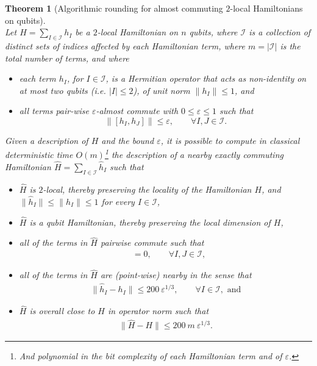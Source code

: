 \documentclass[a4paper,onecolumn,11pt]{quantumarticle}
\theoremstyle{plain}
\newtheorem{theorem}{Theorem}[section]
\newcommand{\eps}{\varepsilon}
\begin{document}
\begin{theorem}[Algorithmic rounding for almost commuting $2$-local Hamiltonians on qubits]\label{thm:transforming-hamiltonian}\ \\
Let $H = \sum\limits_{I \in \mathcal{I}} h_{I}$ be a $2$-local 
Hamiltonian on $n$ qubits, where $\mathcal{I}$ is a collection of distinct sets of indices affected by each Hamiltonian term, where $m = |\mathcal{I}|$ is the total number of terms, and where
\begin{itemize}
    \item each term $h_{I}$, for $I \in \mathcal{I}$, is a Hermitian operator that acts as non-identity on at most two qubits (i.e. $|I| \leq 2$), of unit norm $\| h_I \| \leq 1$, and
    \item all terms pair-wise $\eps$-almost commute with $0 \leq \eps \leq 1$ such that
\[ \| [h_{I}, h_{J} ] \| \leq \eps, \quad\quad \forall I, J \in \mathcal{I}. \]
\end{itemize}
Given a description of $H$ and the bound $\eps$, it is possible to compute in classical deterministic time $O(m)$\footnote{And polynomial in the bit complexity of each Hamiltonian term and of $\eps$.} the description of a nearby exactly commuting Hamiltonian $\hat{H} = \sum\limits_{I \in \mathcal{I}} \hat{h}_{I}$ such that 
\begin{itemize}
\item $\hat{H}$ is $2$-local, thereby preserving the locality of the Hamiltonian $H$, and $\|\hat{h}_I\|\leq\|h_I\|\leq 1$ for every $I\in\mathcal{I}$,
\item $\hat{H}$ is a qubit Hamiltonian, thereby preserving the local dimension of $H$,
\item all of the terms in $\hat{H}$ pairwise commute such that
    \begin{align} 
[\hat{h}_{I}, \hat{h}_{J}] &= 0, \quad\quad \forall I, J \in \mathcal{I}, \label{eq:exact-commutation}
\end{align}
\item all of the terms in $\hat{H}$ are (point-wise) nearby in the sense that 
\begin{align}
\| \hat{h}_{I} - h_{I} \| \leq 200\ \eps^{1/3}, \quad\quad \forall I \in \mathcal{I}, \text{ and}\label{eq:overall-rounding-term-error}
\end{align}
\item $\hat{H}$ is overall close to $H$ in operator norm such that
\begin{align}
\|\hat{H} - H\| \leq 200\ m \ \eps^{1/3}.\label{eq:rounding-error}
\end{align}
\end{itemize}
\end{theorem}
\end{document}
